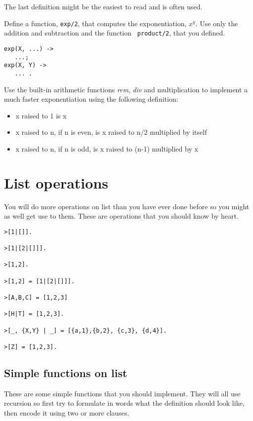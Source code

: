 \documentclass[a4paper,11pt]{article}
\begin{document}
The last definition might be the easiest to read and is often used.

Define a function, {\tt exp/2}, that computes the exponentiation,
$x^y$. Use only the addition and subtraction and the function {\tt
  product/2}, that you defined.

\begin{verbatim}
exp(X, ...) -> 
   ...;
exp(X, Y) -> 
   ... .
\end{verbatim}

Use the built-in arithmetic functions {\em rem}, {\em div} and
multiplication {\em *} to implement a much faster exponentiation using
the following definition:

\begin{itemize}
  \item x raised to 1 is x
  \item x raised to n, if n is even, is x raised to n/2 multiplied by itself
  \item x raised to n, if n is odd, is x raised to (n-1) multiplied by x
\end{itemize}


\section{List operations}

You will do more operations on list than you have ever done before so
you might as well get use to them. These are operations that you should
know by heart.

\begin{verbatim}
>[1|[]].

>[1|[2|[]]].

>[1,2].

>[1,2] = [1|[2|[]]].

>[A,B,C] = [1,2,3]

>[H|T] = [1,2,3].

>[_, {X,Y} | _] = [{a,1},{b,2}, {c,3}, {d,4}].

>[Z] = [1,2,3].
\end{verbatim}

\subsection{Simple functions on list}

These are some simple functions that you should implement. They will
all use recursion so first try to formulate in words what the
definition should look like, then encode it using two or more clauses.
\end{document}
